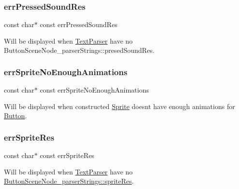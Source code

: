 \subsubsection{\texorpdfstring{err\+Pressed\+Sound\+Res}{errPressedSoundRes}}
{\footnotesize\ttfamily const char$\ast$ const err\+Pressed\+Sound\+Res}

Will be displayed when \hyperlink{struct_text_parser}{Text\+Parser} have no Button\+Scene\+Node\+\_\+parser\+Strings\+::presed\+Sound\+Res. \hypertarget{struct_button_scene_node__error_messages_a0b780715927c1774033283fc5f1e60db}{}\label{struct_button_scene_node__error_messages_a0b780715927c1774033283fc5f1e60db} 
\subsubsection{\texorpdfstring{err\+Sprite\+No\+Enough\+Animations}{errSpriteNoEnoughAnimations}}
{\footnotesize\ttfamily const char$\ast$ const err\+Sprite\+No\+Enough\+Animations}

Will be displayed when constructed \hyperlink{struct_sprite}{Sprite} doesn\textquotesingle{}t have enough animations for \hyperlink{struct_button}{Button}. \hypertarget{struct_button_scene_node__error_messages_ad6133b178aff7e77482cdc3919ce7a09}{}\label{struct_button_scene_node__error_messages_ad6133b178aff7e77482cdc3919ce7a09} 
\subsubsection{\texorpdfstring{err\+Sprite\+Res}{errSpriteRes}}
{\footnotesize\ttfamily const char$\ast$ const err\+Sprite\+Res}

Will be displayed when \hyperlink{struct_text_parser}{Text\+Parser} have no \hyperlink{struct_button_scene_node__parser_strings_a008090dd7a5af169656ea5a85a437385}{Button\+Scene\+Node\+\_\+parser\+Strings\+::sprite\+Res}. \hypertarget{struct_button_scene_node__error_messages_a4039af7d7af66f85b0dd8d17b4549ea8}{}\label{struct_button_scene_node__error_messages_a4039af7d7af66f85b0dd8d17b4549ea8} 
